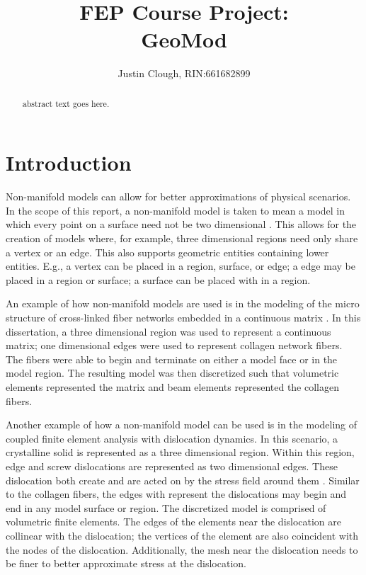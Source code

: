 \documentclass[a4paper, 12pt]{article}
\author{Justin Clough, RIN:661682899}
\title{FEP Course Project: \\
        GeoMod}
\begin{document}
\maketitle

\begin{abstract}
abstract text goes here.

\end{abstract}

\newpage
\section{Introduction} \label{sec:intro}
Non-manifold models can allow for better approximations of physical scenarios. 
In the scope of this report, a non-manifold model is taken to mean 
a model in which every point on a surface need not be two dimensional \cite{weiler86}. 
This allows for the creation of models where, for example, three
dimensional regions need only share a vertex or an edge. This also 
supports geometric entities containing lower entities. E.g., a vertex
can be placed in a region, surface, or edge; a edge may be placed in
a region or surface; a surface can be placed with in a region.

An example of how non-manifold models are used is in 
the modeling of the micro structure of cross-linked 
fiber networks embedded in a continuous matrix \cite{zhangThesis}. 
In this dissertation, a three dimensional region was used to represent 
a continuous matrix; one dimensional edges were used to represent collagen 
network fibers. The fibers were able to begin and terminate on either a 
model face or in the model region. The resulting model was then discretized 
such that volumetric elements represented the matrix 
and beam elements represented the collagen fibers.

Another example of how a non-manifold model can be used is in the 
modeling of coupled finite element analysis with dislocation dynamics. 
In this scenario, a crystalline solid is represented as a three dimensional 
region. Within this region, edge and screw dislocations are represented
as two dimensional edges. These dislocation both create and are acted on
by the stress field around them \cite{askeland}. Similar to the collagen 
fibers, the edges with represent the dislocations may begin and end in
any model surface or region. The discretized model is comprised of 
volumetric finite elements. The edges of the elements near the dislocation 
are collinear with the dislocation; the vertices of the element are also
coincident with the nodes of the dislocation. Additionally, the mesh near
the dislocation needs to be finer to better approximate stress at the
dislocation.
\end{document}
